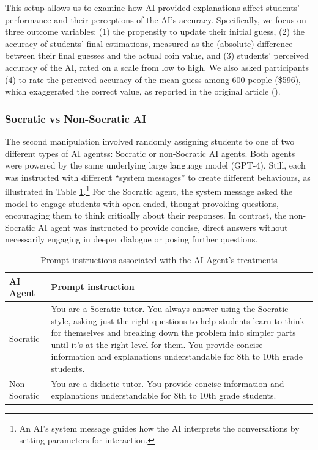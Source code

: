 \documentclass[
  12pt,
]{article}
\begin{document}
This setup allows us to examine how AI-provided explanations affect students' performance and their perceptions of the AI's accuracy. Specifically, we focus on three outcome variables: (1) the propensity to update their initial guess, (2) the accuracy of students' final estimations, measured as the (absolute) difference between their final guesses and the actual coin value, and (3) students' perceived accuracy of the AI, rated on a scale from low to high. We also asked participants (4) to rate the perceived accuracy of the mean guess among 600 people (\$596), which exaggerated the correct value, as reported in the original article ().

\subsubsection{Socratic vs Non-Socratic AI}\label{socratic-vs-non-socratic-ai}

The second manipulation involved randomly assigning students to one of two different types of AI agentss: Socratic or non-Socratic AI agents. Both agents were powered by the same underlying large language model (GPT-4). Still, each was instructed with different ``system messages'' to create different behaviours, as illustrated in Table \ref{tab:prompts}.\footnote{An AI's system message guides how the AI interprets the conversations by setting parameters for interaction.} For the Socratic agent, the system message asked the model to engage students with open-ended, thought-provoking questions, encouraging them to think critically about their responses. In contrast, the non-Socratic AI agent was instructed to provide concise, direct answers without necessarily engaging in deeper dialogue or posing further questions.

\begin{table}

\caption{\label{tab:prompts}Prompt instructions associated with the AI Agent's treatments}
\centering
\begin{tabular}[t]{l>{\raggedright\arraybackslash}p{4in}}
\toprule
AI Agent & Prompt instruction\\
\midrule
Socratic & You are a Socratic tutor. You always answer using the Socratic style, asking just the right questions to help students learn to think for themselves and breaking down the problem into simpler parts until it's at the right level for them. You provide concise information and explanations understandable for 8th to 10th grade students.\\
Non-Socratic & You are a didactic tutor. You provide concise information and explanations understandable for 8th to 10th grade students.\\
\bottomrule
\end{tabular}
\end{table}
\end{document}
